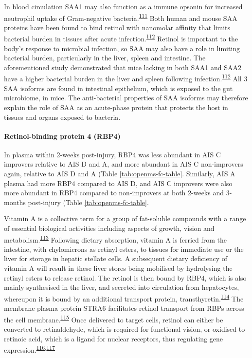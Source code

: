 \documentclass[
]{article}
\begin{document}
In blood circulation SAA1 may also function as a immune opsonin for increased neutrophil uptake of Gram-negative bacteria.\textsuperscript{\protect\hyperlink{ref-shah_serum_2006}{111}}
Both human and mouse SAA proteins have been found to bind retinol with nanomolar affinity that limits bacterial burden in tissues after acute infection.\textsuperscript{\protect\hyperlink{ref-derebe_serum_2014}{112}}
Retinol is important to the body's response to microbial infection, so SAA may also have a role in limiting bacterial burden, particularly in the liver, spleen and intestine.
The aforementioned study demonstrated that mice lacking in both SAA1 and SAA2 have a higher bacterial burden in the liver and spleen following infection.\textsuperscript{\protect\hyperlink{ref-derebe_serum_2014}{112}}
All 3 SAA isoforms are found in intestinal epithelium, which is exposed to the gut microbiome, in mice.
The anti-bacterial properties of SAA isoforms may therefore explain the role of SAA as an acute-phase protein that protects the host in tissues and organs exposed to bacteria.

\hypertarget{retinol-binding-protein-4-rbp4}{%
\paragraph{Retinol-binding protein 4 (RBP4)}\label{retinol-binding-protein-4-rbp4}}

In plasma within 2-weeks post-injury, RBP4 was less abundant in AIS C improvers relative to AIS D and A, and more abundant in AIS C non-improvers again, relative to AIS D and A (Table \ref{tab:openms-fc-table}.
Similarly, AIS A plasma had more RBP4 compared to AIS D, and AIS C improvers were also more abundant in RBP4 compared to non-improvers at both 2-weeks and 3-months post-injury (Table \ref{tab:openms-fc-table}.

Vitamin A is a collective term for a group of fat-soluble compounds with a range of essential biological activities including aspects of growth, vision and metabolism.\textsuperscript{\protect\hyperlink{ref-blomhoff_overview_2006}{113}}
Following dietary absorption, vitamin A is ferried from the intestine, with chylomicrons as retinyl esters, to tissues for immediate use or the liver for storage in hepatic stellate cells.
A subsequent dietary deficiency of vitamin A will result in these liver stores being mobilised by hydrolysing the retinyl esters to release retinol.
The retinol is then bound by RBP4, which is also mainly synthesised in the liver, and secreted into circulation from hepatocytes, whereupon it is bound by an additional transport protein, transthyretin.\textsuperscript{\protect\hyperlink{ref-peterson_studies_1971}{114}}
The membrane plasma protein STRA6 facilitates retinol transport from RBPs across the cell membrane.\textsuperscript{\protect\hyperlink{ref-berry_cross_2012}{115}}
Once delivered to target cells, retinol can either be converted to retinaldehyde, which is required for functional vision, or oxidised to retinoic acid, which is a ligand for nuclear receptors, thus regulating gene expression.\textsuperscript{\protect\hyperlink{ref-lane_role_2005}{116},\protect\hyperlink{ref-balmer_gene_2002}{117}}
\end{document}
